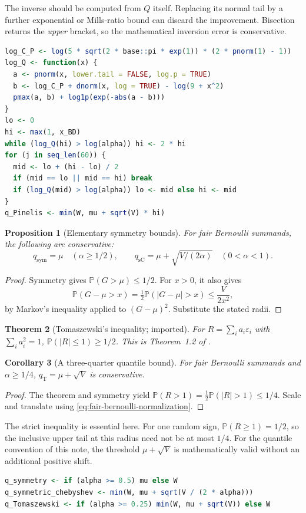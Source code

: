 \documentclass[11pt,letterpaper]{article}
\numberwithin{equation}{section}
\newtheorem{theorem}{Theorem}[section]
\newtheorem{proposition}[theorem]{Proposition}
\newtheorem{corollary}[theorem]{Corollary}
\theoremstyle{definition}
\theoremstyle{remark}
\begin{document}
The inverse should be computed from $Q$ itself. Replacing its normal tail by
a further exponential or Mills-ratio bound can discard the improvement.
Bisection returns the \emph{upper} bracket, so the mathematical inversion
error is conservative.
\begin{lstlisting}[language=R]
log_C_P <- log(5 * sqrt(2 * base::pi * exp(1)) * (2 * pnorm(1) - 1))
log_Q <- function(x) {
  a <- pnorm(x, lower.tail = FALSE, log.p = TRUE)
  b <- log_C_P + dnorm(x, log = TRUE) - log(9 + x^2)
  pmax(a, b) + log1p(exp(-abs(a - b)))
}
lo <- 0
hi <- max(1, x_BD)
while (log_Q(hi) > log(alpha)) hi <- 2 * hi
for (j in seq_len(60)) {
  mid <- lo + (hi - lo) / 2
  if (mid == lo || mid == hi) break
  if (log_Q(mid) > log(alpha)) lo <- mid else hi <- mid
}
q_Pinelis <- min(W, mu + sqrt(V) * hi)
\end{lstlisting}

\begin{proposition}[Elementary symmetry bounds]
\label{prop:symmetry-quantiles}
For fair Bernoulli summands, the following are conservative:
\[
  q_{\mathrm{sym}}=\mu\quad(\alpha\ge1/2),\qquad
  q_{\mathrm{sC}}=\mu+\sqrt{V/(2\alpha)}\quad(0<\alpha<1).
\]
\end{proposition}
\begin{proof}
Symmetry gives $\mathbb{P}(G>\mu)\le1/2$. For $x>0$, it also gives
\[
  \mathbb{P}(G-\mu>x)
  =\tfrac12\mathbb{P}(|G-\mu|>x)
  \le\frac{V}{2x^2},
\]
by Markov's inequality applied to $(G-\mu)^2$. Substitute the stated radii.
\end{proof}

\begin{theorem}[Tomaszewski's inequality; imported]
\label{thm:tomaszewski}
For $R=\sum_i a_i\varepsilon_i$ with $\sum_i a_i^2=1$,
$\mathbb{P}(|R|\le1)\ge1/2$. This is Theorem~1.2 of
\cite{kellerklein2022}.
\end{theorem}
\begin{corollary}[A three-quarter quantile bound]
For fair Bernoulli summands and $\alpha\ge1/4$,
$q_{\mathrm T}=\mu+\sqrt V$ is conservative.
\end{corollary}
\begin{proof}
The theorem and symmetry yield
$\mathbb{P}(R>1)=\tfrac12\mathbb{P}(|R|>1)\le1/4$.
Scale and translate using \eqref{eq:fair-bernoulli-normalization}.
\end{proof}

The strict inequality is essential here. For one random sign,
$\mathbb{P}(R\ge1)=1/2$, so the inclusive upper tail at this radius need not
be at most $1/4$. For the quantile convention of this note, the threshold
$\mu+\sqrt V$ is mathematically valid without an additional positive shift.
\begin{lstlisting}[language=R]
q_symmetry <- if (alpha >= 0.5) mu else W
q_symmetric_chebyshev <- min(W, mu + sqrt(V / (2 * alpha)))
q_Tomaszewski <- if (alpha >= 0.25) min(W, mu + sqrt(V)) else W
\end{lstlisting}
\end{document}

